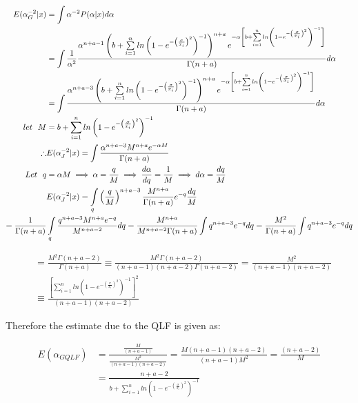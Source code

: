\documentclass[a4paper,12pt]{report}
\begin{document}
\[\begin{split}\footnotesize
E(\alpha_G^{-2}|x)&=\int \alpha^{-2}P(\alpha|x)d\alpha\\
&=\int \frac{1}{\alpha^2}\frac{\alpha^{n+a-1}\left(b+\sum\limits_{ i=1 }^{n}ln\left(1-e^{-\left(\frac{\sigma}{x_i}\right)^2}\right)^{-1}\right)^{n+a} e^{-\alpha \left[b+\sum\limits_{ i=1 }^{n}ln\left(1-e^{-\left(\frac{\sigma}{x_i}\right)^2}\right)^{-1}\right]}}{\Gamma(n+a)}d\alpha\\
&=\int \frac{\alpha^{n+a-3}\left(b+\sum\limits_{ i=1 }^{n}ln\left(1-e^{-\left(\frac{\sigma}{x_i}\right)^2}\right)^{-1}\right)^{n+a} e^{-\alpha \left[b+\sum\limits_{ i=1 }^{n}ln\left(1-e^{-\left(\frac{\sigma}{x_i}\right)^2}\right)^{-1}\right]}}{\Gamma(n+a)}d\alpha\\
let \ \ M &=b+\sum\limits_{ i=1 }^{n}ln\left(1-e^{-\left(\frac{\sigma}{x_i}\right)^2}\right)^{-1}\\
\therefore &E(\alpha_J^{-2}|x) = \int \frac{\alpha^{n+a-3}M^{n+a} e^{-\alpha M}}{\Gamma(n+a)}\\
Let\ \ q&=\alpha M\implies\alpha=\dfrac{q}{M}\implies\dfrac{d\alpha}{dq}=\dfrac{1}{M}\implies d\alpha=\dfrac{dq}{M}\\
&E(\alpha_J^{-2}|x)=\int\limits_{q}\left(\frac{q}{M}\right)^{n+a-3}\frac{M^{n+a}}{\Gamma(n+a)}e^{-q}\frac{dq}{M}\\
=\frac{1}{\Gamma(n+a)}&\int\limits_{q}\frac{q^{n+a-3}M^{n+a}e^{-q}}{M^{n+a-2}}dq=\frac{M^{n+a}}{M^{n+a-2}\Gamma(n+a)}\int q^{n+a-3}e^{-q}dq=\frac{M^2}{\Gamma(n+a)}\int q^{n+a-3}e^{-q}dq\\
\end{split}\]


\begin{equation}\label{pstb}
\begin{split}
&=\frac{M^2 \Gamma(n+a-2)}{\Gamma(n+a)}\equiv \frac{M^2 \Gamma(n+a-2)}{(n+a-1)(n+a-2)\Gamma(n+a-2)}=\frac{M^2}{(n+a-1)(n+a-2)}\\
&\equiv \frac{\left[\sum\limits_{ i=1 }^{n}ln\left(1-e^{-\left(\frac{\sigma}{x_i}\right)^2}\right)^{-1}\right]^2}{(n+a-1)(n+a-2)}
\end{split}
\end{equation}

Therefore the estimate due to the QLF is given as:

\begin{equation}
\begin{split}
E(\alpha_{GQLF})&=\frac{\frac{M}{(n+a-1)}}{\frac{M^2 }{(n+a-1)(n+a-2)}}=\frac{M(n+a-1)(n+a-2)}{(n+a-1)M^2}=\frac{(n+a-2)}{M}\\
&=\frac{n+a-2}{b+\sum\limits_{ i=1 }^{n}ln\left(1-e^{-\left(\frac{\sigma}{x_i}\right)^2}\right)^{-1}}
\end{split}
\end{equation}
\end{document}
